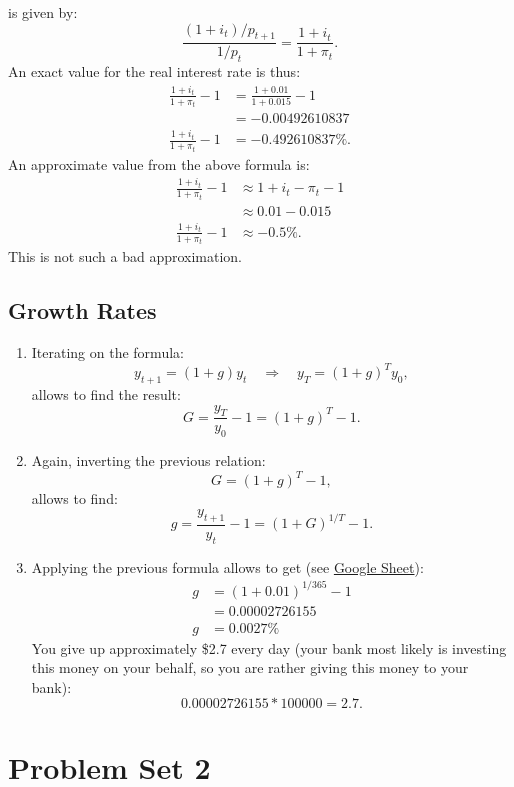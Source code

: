 \documentclass[]{book}
\theoremstyle{definition}
\theoremstyle{definition}
\theoremstyle{definition}
\theoremstyle{remark}
\begin{document}
\begin{enumerate}
  is given by: \[\frac{(1+i_t)/p_{t+1}}{1/p_t}=\frac{1+i_t}{1+\pi_t}.\]
  An exact value for the real interest rate is thus: \[\begin{aligned}
  \frac{1+i_t}{1+\pi_t}-1&=\frac{1+0.01}{1+0.015}-1\\
  &=-0.00492610837\\ 
  \frac{1+i_t}{1+\pi_t}-1&= -0.492610837\%.
  \end{aligned}\] An approximate value from the above formula is:
  \[\begin{aligned}
  \frac{1+i_t}{1+\pi_t}-1&\approx1+i_t-\pi_t-1\\
  &\approx0.01-0.015\\
  \frac{1+i_t}{1+\pi_t}-1&\approx-0.5\%.
  \end{aligned}\] This is not such a bad approximation.
\end{enumerate}

\section*{Growth Rates}\label{growth-rates-1}

\begin{enumerate}
\def\labelenumi{\arabic{enumi}.}
\item
  Iterating on the formula:
  \[y_{t+1}=(1+g)y_t \quad \Rightarrow \quad y_T=(1+g)^Ty_0,\] allows to
  find the result: \[G = \frac{y_T}{y_0}-1=(1+g)^T-1.\]
\item
  Again, inverting the previous relation: \[G = (1+g)^T-1,\] allows to
  find: \[g = \frac{y_{t+1}}{y_{t}}-1=(1+G)^{1/T}-1.\]
\item
  Applying the previous formula allows to get (see
  \href{https://docs.google.com/spreadsheets/d/108I8xuosIQvgU6wOGrfwzHhE4p1OStgv8iIpzZ-4vME/edit?usp=sharing}{Google
  Sheet}): \[\begin{aligned}
  g &=(1+0.01)^{1/365}-1\\
   &= 0.00002726155\\
  g &=0.0027\%
  \end{aligned}\] You give up approximately \$2.7 every day (your bank
  most likely is investing this money on your behalf, so you are rather
  giving this money to your bank): \[0.00002726155*100000=2.7.\]
\end{enumerate}

\chapter{Problem Set 2}\label{pset2}
\end{document}
